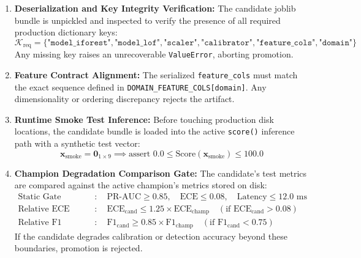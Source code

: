 \begin{enumerate}[leftmargin=*]
    \item \textbf{Deserialization and Key Integrity Verification:}
    The candidate joblib bundle is unpickled and inspected to verify the presence of all required production dictionary keys:
    \begin{equation}
    \mathcal{K}_{\text{req}} = \{\texttt{"model\_iforest"}, \texttt{"model\_lof"}, \texttt{"scaler"}, \texttt{"calibrator"}, \texttt{"feature\_cols"}, \texttt{"domain"}\}
    \end{equation}
    Any missing key raises an unrecoverable \texttt{ValueError}, aborting promotion.
    
    \item \textbf{Feature Contract Alignment:}
    The serialized \texttt{feature\_cols} must match the exact sequence defined in \texttt{DOMAIN\_FEATURE\_COLS[domain]}. Any dimensionality or ordering discrepancy rejects the artifact.
    
    \item \textbf{Runtime Smoke Test Inference:}
    Before touching production disk locations, the candidate bundle is loaded into the active \texttt{score()} inference path with a synthetic test vector:
    \begin{equation}
    \mathbf{x}_{\text{smoke}} = \mathbf{0}_{1 \times 9} \implies \text{assert } 0.0 \le \text{Score}(\mathbf{x}_{\text{smoke}}) \le 100.0
    \end{equation}
    
    \item \textbf{Champion Degradation Comparison Gate:}
    The candidate's test metrics are compared against the active champion's metrics stored on disk:
    \begin{align}
    \text{Static Gate} &: \quad \text{PR-AUC} \ge 0.85, \quad \text{ECE} \le 0.08, \quad \text{Latency} \le 12.0\text{ ms} \\
    \text{Relative ECE Guard} &: \quad \text{ECE}_{\text{cand}} \le 1.25 \times \text{ECE}_{\text{champ}} \quad (\text{if } \text{ECE}_{\text{cand}} > 0.08) \\
    \text{Relative F1 Guard} &: \quad \text{F1}_{\text{cand}} \ge 0.85 \times \text{F1}_{\text{champ}} \quad (\text{if } \text{F1}_{\text{cand}} < 0.75)
    \end{align}
    If the candidate degrades calibration or detection accuracy beyond these boundaries, promotion is rejected.
\end{enumerate}


